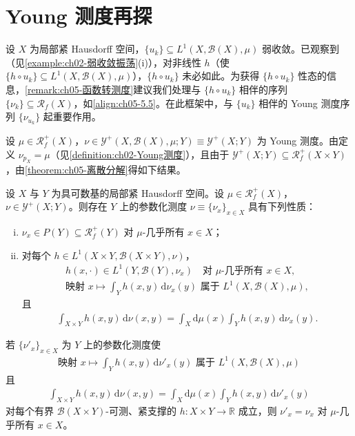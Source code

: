 \documentclass[../../main.tex]{subfiles}%
\begin{document}
\section{Young 测度再探}

设 $X$ 为局部紧 Hausdorff 空间，$\{u_k\}\subseteq L^1(X,\mathscr{B}(X),\mu)$ 弱收敛。已观察到（见\cref{example:ch02-弱收敛振荡}(i)），对非线性 $h$（使 $\{h\circ u_k\}\subseteq L^1(X,\mathscr{B}(X),\mu)$），$\{h\circ u_k\}$ 未必如此。为获得 $\{h\circ u_k\}$ 性态的信息，\cref{remark:ch05-函数转测度}建议我们处理与 $\{h\circ u_k\}$ 相伴的序列 $\{\nu_k\}\subseteq\mathscr{R}_f(X)$，如\eqref{align:ch05-5.5}。在此框架中，与 $\{u_k\}$ 相伴的 Young 测度序列 $\{\nu_{u_k}\}$ 起重要作用。

设 $\mu\in\mathscr{R}^+_f(X)$，$\nu\in\mathcal{Y}^+(X,\mathscr{B}(X),\mu;Y)\equiv\mathcal{Y}^+(X;Y)$ 为 Young 测度。由定义 $\nu_{p_X}=\mu$（见\cref{definition:ch02-Young测度}），且由于 $\mathcal{Y}^+(X;Y)\subseteq\mathscr{R}^+_f(X\times Y)$，由\cref{theorem:ch05-离散分解}得如下结果。

\begin{proposition}\label{proposition:ch05-离散分解}
设 $X$ 与 $Y$ 为具可数基的局部紧 Hausdorff 空间。设 $\mu\in\mathscr{R}^+_f(X)$，$\nu\in\mathcal{Y}^+(X;Y)$。则存在 $Y$ 上的参数化测度 $\nu\equiv\{\nu_x\}_{x\in X}$ 具有下列性质：
\begin{enumerate}[(i)]
\item\label{item:ch05-youdis-i} $\nu_x\in P(Y)\subseteq\mathscr{R}^+_f(Y)$ 对 $\mu$-几乎所有 $x\in X$；
\item\label{item:ch05-youdis-ii} 对每个 $h\in L^1(X\times Y,\mathscr{B}(X\times Y),\nu)$，
\begin{align}
h(x,\cdot)\in L^1(Y,\mathscr{B}(Y),\nu_x)
\quad\text{对 }\mu\text{-几乎所有 }x\in X,\label{align:ch05-5.48}\\
\text{映射 }x\mapsto\int_Y h(x,y)\,\mathrm{d}\nu_x(y)
\text{ 属于 }L^1(X,\mathscr{B}(X),\mu),\label{align:ch05-5.49}
\end{align}
且
\begin{align}
\int_{X\times Y}h(x,y)\,\mathrm{d}\nu(x,y)
=\int_X\mathrm{d}\mu(x)\int_Y h(x,y)\,\mathrm{d}\nu_x(y).\label{align:ch05-5.50}
\end{align}
\end{enumerate}
若 $\{\nu'_x\}_{x\in X}$ 为 $Y$ 上的参数化测度使
\begin{align}
\text{映射 }x\mapsto\int_Y h(x,y)\,\mathrm{d}\nu'_x(y)
\text{ 属于 }L^1(X,\mathscr{B}(X),\mu)\label{align:ch05-5.51}
\end{align}
且
\begin{align}
\int_{X\times Y}h(x,y)\,\mathrm{d}\nu(x,y)
=\int_X\mathrm{d}\mu(x)\int_Y h(x,y)\,\mathrm{d}\nu'_x(y)\label{align:ch05-5.52}
\end{align}
对每个有界 $\mathscr{B}(X\times Y)$-可测、紧支撑的 $h:X\times Y\to\mathbb{R}$ 成立，则 $\nu'_x=\nu_x$ 对 $\mu$-几乎所有 $x\in X$。
\end{proposition}
\end{document}
